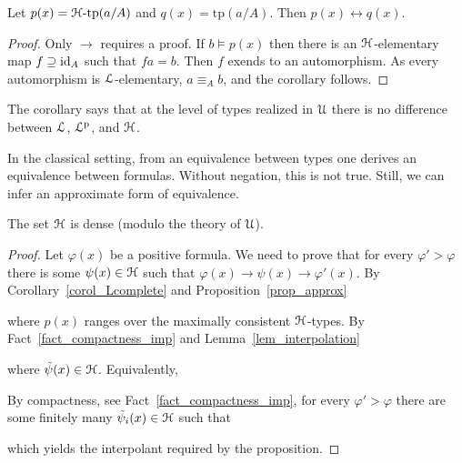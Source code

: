 \documentclass[10pt,oneside]{amsproc}
\begin{document}
\begin{corollary}\label{corol_Lcomplete}
  Let $p(x)={\EuScript H}\mbox{-tp}(a/A)$ and $q(x)=\mbox{tp}(a/A)$. Then $p(x)\leftrightarrow q(x)$.
\end{corollary}

\begin{proof}
  Only $\rightarrow$ requires a proof.
  If $b\models p(x)$ then there is an ${\EuScript H}$-elementary map $f\supseteq{\rm id}_A$ such that $fa=b$.
  Then $f$ exends to an automorphism.
  As every automorphism is ${\EuScript L}$-elementary, $a\equiv_Ab$, and the corollary follows.
\end{proof}

The corollary says that at the level of types realized in ${\EuScript U}$ there is no difference between ${\EuScript L}$, ${\EuScript L}^{\rm p}$, and ${\EuScript H}$.

In the classical setting, from an equivalence between types one derives an  equivalence between formulas.
Without negation, this is not true.
Still, we can infer an approximate form of equivalence.

\begin{proposition}\label{prop_LHapprox1}
  The set ${\EuScript H}$ is dense (modulo the theory of ${\EuScript U}$).
\end{proposition}

\begin{proof}
  Let $\varphi(x)$ be a positive formula.
  We need to prove that for every $\varphi'>\varphi$ there is some $\psi(x)\in{\EuScript H}$ such that $\varphi(x)\rightarrow\psi(x)\rightarrow\varphi'(x)$.
  By Corollary~\ref{corol_Lcomplete} and Proposition~\ref{prop_approx}


  where $p(x)$ ranges over the maximally consistent ${\EuScript H}$-types.
  By Fact~\ref{fact_compactness_imp} and Lemma~\ref{lem_interpolation}


  where $\tilde{\psi}(x)\in{\EuScript H}$.
  Equivalently,


  By compactness, see Fact~\ref{fact_compactness_imp}, for every $\varphi'>\varphi$ there are some finitely many $\tilde{\psi}_i(x)\in{\EuScript H}$ such that


  which yields the interpolant required by the proposition.
\end{proof}
\end{document}
